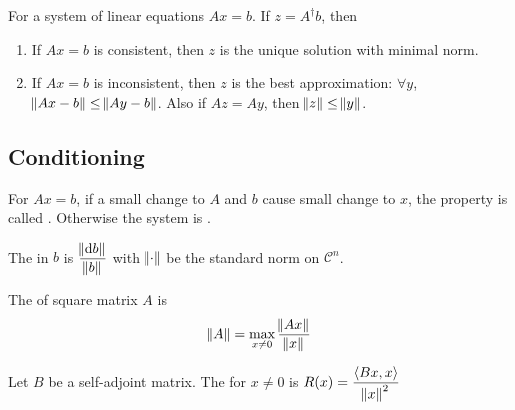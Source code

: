 \begin{theorem}
    For a system of linear equations $Ax = b$. If $z = A^\dag b$, then
    \begin{enumerate}
        \item If $Ax=b$ is consistent, then $z$ is the unique solution with minimal norm.
        \item If $Ax=b$ is inconsistent, then $z$ is the best approximation: $\forall y$, $\norm{Ax-b} \leq \norm{Ay-b}$. Also if $Az = Ay$, then $\norm{z} \leq \norm{y}$.
    \end{enumerate}
\end{theorem}





\subsection{Conditioning}

\begin{definition}
    For $Ax=b$, if a small change to $A$ and $b$ cause small change to $x$, the property is called . Otherwise the system is .
\end{definition}

\begin{definition}
    The  in $b$ is $\displaystyle \frac{\norm{\dif{b}}}{\norm{b}}$ with $\norm{\cdot}$ be the standard norm on $\mathcal{C}^n$.
\end{definition}

\begin{definition}
    The  of square matrix $A$ is 
    \begin{equation}
        \norm{A} = \max_{x \neq 0} \frac{\norm{Ax}}{\norm{x}}
    \end{equation}
\end{definition}


\begin{definition}
    Let $B$ be a self-adjoint matrix. The  for $x \neq 0$ is $\displaystyle R(x) = \frac{\left\langle \displaystyle Bx, x \right\rangle}{\norm{x}^2}$
\end{definition}


